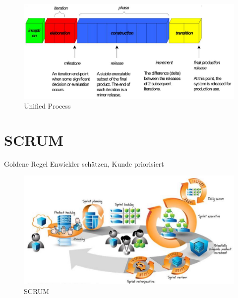 \begin{figure}[h!]
\centering
\includegraphics[width=0.9\linewidth]{images/unified_process}
\caption{Unified Process}
\label{fig:unifiedprocess}
\end{figure}

\section{SCRUM}
\begin{remember}{Goldene Regel}{}
	Enwickler schätzen, Kunde priorisiert
\end{remember}


\begin{figure}[h]
	\centering
	\includegraphics[width=0.9\linewidth]{images/scrum}
	\caption{SCRUM}
	\label{fig:scrum}
\end{figure}


